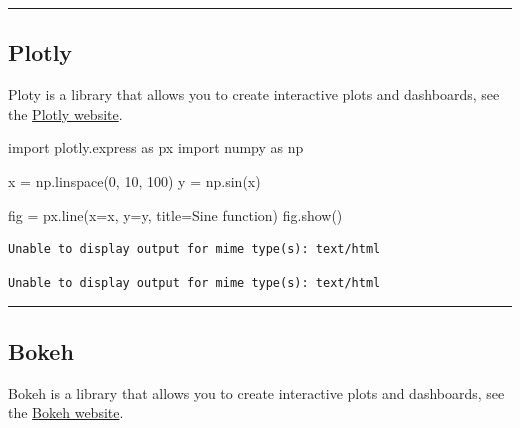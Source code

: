 \documentclass[
  letterpaper,
  DIV=11,
  numbers=noendperiod]{scrreprt}
\newenvironment{Shaded}{\begin{snugshade}}{\end{snugshade}}
\newcommand{\DecValTok}[1]{\textcolor[rgb]{0.68,0.00,0.00}{#1}}
\newcommand{\ImportTok}[1]{\textcolor[rgb]{0.00,0.46,0.62}{#1}}
\newcommand{\NormalTok}[1]{\textcolor[rgb]{0.00,0.23,0.31}{#1}}
\newcommand{\OperatorTok}[1]{\textcolor[rgb]{0.37,0.37,0.37}{#1}}
\newcommand{\StringTok}[1]{\textcolor[rgb]{0.13,0.47,0.30}{#1}}
\begin{document}
\begin{center}\rule{0.5\linewidth}{0.5pt}\end{center}

\subsection*{Plotly}\label{plotly}

Ploty is a library that allows you to create interactive plots and
dashboards, see the \href{https://plotly.com/graphing-libraries/}{Plotly
website}.

\begin{Shaded}
\begin{Highlighting}[]
\ImportTok{import}\NormalTok{ plotly.express }\ImportTok{as}\NormalTok{ px}
\ImportTok{import}\NormalTok{ numpy }\ImportTok{as}\NormalTok{ np}

\NormalTok{x }\OperatorTok{=}\NormalTok{ np.linspace(}\DecValTok{0}\NormalTok{, }\DecValTok{10}\NormalTok{, }\DecValTok{100}\NormalTok{)}
\NormalTok{y }\OperatorTok{=}\NormalTok{ np.sin(x)}

\NormalTok{fig }\OperatorTok{=}\NormalTok{ px.line(x}\OperatorTok{=}\NormalTok{x, y}\OperatorTok{=}\NormalTok{y, title}\OperatorTok{=}\StringTok{\textquotesingle{}Sine function\textquotesingle{}}\NormalTok{)}
\NormalTok{fig.show()}
\end{Highlighting}
\end{Shaded}

\begin{verbatim}
Unable to display output for mime type(s): text/html
\end{verbatim}

\begin{verbatim}
Unable to display output for mime type(s): text/html
\end{verbatim}

\begin{center}\rule{0.5\linewidth}{0.5pt}\end{center}

\subsection*{Bokeh}\label{bokeh}

Bokeh is a library that allows you to create interactive plots and
dashboards, see the
\href{https://docs.bokeh.org/en/latest/index.html}{Bokeh website}.
\end{document}
